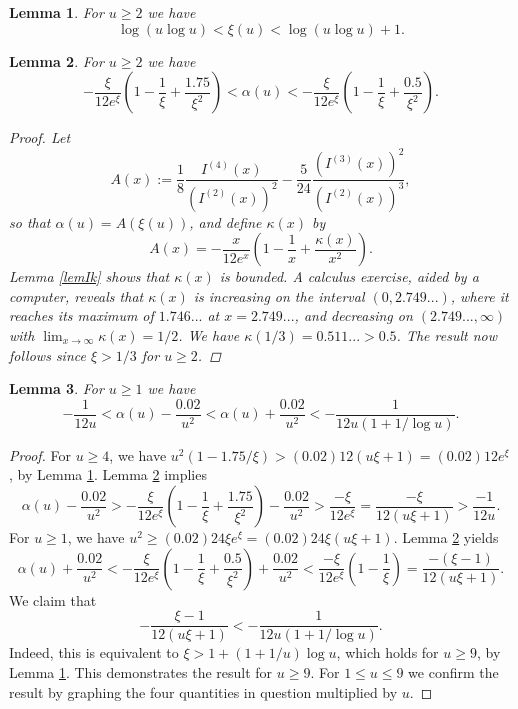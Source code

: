 \documentclass[10pt,a4paper]{amsart}
\newtheorem{lemma}{Lemma}
\begin{document}
\begin{lemma}\label{lemxi}
For $u\ge 2$ we have 
$$
\log (u\log u) < \xi(u) < \log (u\log u) +1.
$$
\end{lemma}

\begin{lemma}\label{lemAx}
For $u\ge 2$ we have 
$$
 -\frac{\xi}{12 e^\xi}\left(1-\frac{1}{\xi}+\frac{1.75}{\xi^2}\right)< \alpha(u)< -\frac{\xi}{12 e^\xi}\left(1-\frac{1}{\xi}+\frac{0.5}{\xi^2}\right) .
$$
\begin{proof}
Let
$$
A(x):=\frac{1}{8} \frac{I^{(4)}(x)}{(I^{(2)}(x))^2} - \frac{5}{24} \frac{(I^{(3)}(x))^2}{(I^{(2)}(x))^3} ,
$$
so that $\alpha(u)=A(\xi(u))$, and
define $\kappa(x)$ by 
$$
A(x) = -\frac{x}{12 e^x}\left(1-\frac{1}{x}+\frac{\kappa(x)}{x^2}\right).
$$
Lemma \ref{lemIk} shows that $\kappa(x)$ is bounded.
A calculus exercise, aided by a computer, reveals that 
$\kappa(x)$ is increasing on the interval $(0, 2.749...)$, where it reaches its maximum of $1.746...$ at $x=2.749...$, and decreasing 
on $(2.749..., \infty)$ with $\lim_{x\to \infty} \kappa(x) = 1/2$. We have $\kappa(1/3)=0.511...>0.5$. 
The result now follows since $\xi >1/3$ for $u\ge 2$. 
\end{proof}
\end{lemma}

\begin{lemma}\label{lemalpha}
For $u\ge 1$ we have 
$$
-\frac{1}{12 u}
<\alpha(u)-\frac{0.02}{u^2} < \alpha(u)+\frac{0.02}{u^2} 
< - \frac{1}{12 u (1+1/\log u)}.
$$
\end{lemma}

\begin{proof}
For $u\ge 4$, we have $u^2(1-1.75/\xi) >(0.02)  12(u\xi +1)=(0.02) 12  e^\xi$, by Lemma \ref{lemxi}. Lemma \ref{lemAx} 
implies
$$
\alpha(u) -\frac{0.02}{u^2}>  -\frac{\xi}{12 e^\xi}\left(1-\frac{1}{\xi}+\frac{1.75}{\xi^2}\right)-\frac{0.02}{u^2}
>  \frac{-\xi}{12 e^\xi}=\frac{-\xi}{12 (u\xi+1)}> \frac{-1}{12 u}.
$$
For $u\ge 1$, we have $u^2\ge (0.02) 24 \xi e^\xi= (0.02) 24 \xi(u\xi+1)$. Lemma \ref{lemAx} yields
$$
\alpha(u) +\frac{0.02}{u^2} < -\frac{\xi}{12 e^\xi}\left(1-\frac{1}{\xi}+\frac{0.5}{\xi^2}\right)+\frac{0.02}{u^2}
< \frac{-\xi}{12 e^\xi}\left(1-\frac{1}{\xi}\right)=\frac{-(\xi -1)}{12(u\xi+1)}.
$$
We claim that 
$$
-\frac{\xi -1}{12(u\xi+1)}< -\frac{1}{12u(1+1/\log u)}.
$$
Indeed, this is equivalent to $\xi>1+(1+1/u)\log u$, which holds for $u\ge 9$, by Lemma \ref{lemxi}.
This demonstrates the result for $u\ge 9$. For $1 \le u\le 9$ we confirm the result by graphing the
four quantities in question multiplied by $u$. 
\end{proof}
\end{document}
